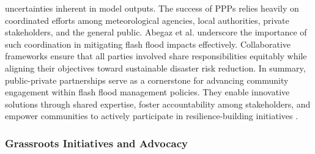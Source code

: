 uncertainties inherent in model outputs. The success of PPPs relies heavily on coordinated efforts among meteorological agencies, local authorities, private stakeholders, and the general public. Abegaz et al. \citep{Abegaz2024} underscore the importance of such coordination in mitigating flash flood impacts effectively. Collaborative frameworks ensure that all parties involved share responsibilities equitably while aligning their objectives toward sustainable disaster risk reduction. In summary, public-private partnerships serve as a cornerstone for advancing community engagement within flash flood management policies. They enable innovative solutions through shared expertise, foster accountability among stakeholders, and empower communities to actively participate in resilience-building initiatives \citep{Saad2024}\citep{Abegaz2024}\citep{Borga2019}.
\subsubsection{Grassroots Initiatives and Advocacy}
